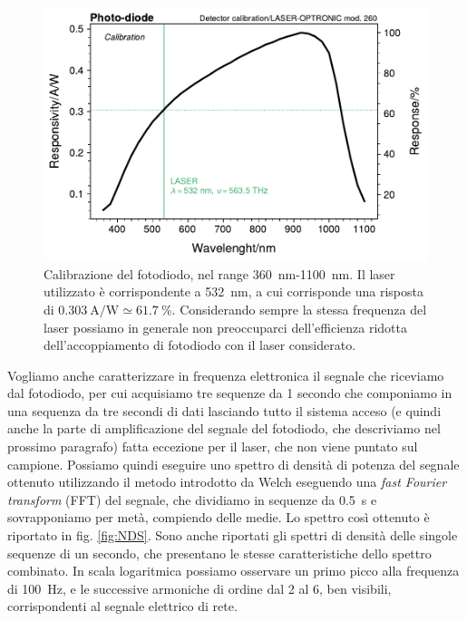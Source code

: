 \documentclass[
    prb,altaffilletter,citeautoscript,
    amsmath,amssymb,
    showpacs,showkeys,floatfix,
    reprint
]{revtex4-1}
\begin{document}
\begin{figure}
    \centering
    \includegraphics[width=\linewidth]{figures/detector_calib.pdf}
    \caption{Calibrazione del fotodiodo, nel range \SI{360}{\nano\metre}-\SI{1100}{\nano\metre}. Il laser utilizzato è corrispondente a \SI{532}{\nano\metre}, a cui corrisponde una risposta di $\SI{0.303}{\ampere\per\watt}\simeq\SI{61.7}{\%}$. Considerando sempre la stessa frequenza del laser possiamo in generale non preoccuparci dell'efficienza ridotta dell'accoppiamento di fotodiodo con il laser considerato.}
    \label{fig:detector_calib}
\end{figure}

Vogliamo anche caratterizzare in frequenza elettronica il segnale che riceviamo dal fotodiodo, per cui acquisiamo tre sequenze da 1 secondo che componiamo in una sequenza da tre secondi di dati lasciando tutto il sistema acceso (e quindi anche la parte di amplificazione del segnale del fotodiodo, che descriviamo nel prossimo paragrafo) fatta eccezione per il laser, che non viene puntato sul campione. Possiamo quindi eseguire uno spettro di densità di potenza del segnale ottenuto utilizzando il metodo introdotto da Welch\cite{welchUseFastFourier1967a} eseguendo una \emph{fast Fourier transform} (FFT)  del segnale, che dividiamo in sequenze da \SI{0.5}{\second} e sovrapponiamo per metà, compiendo delle medie. Lo spettro così ottenuto è riportato in fig. \ref{fig:NDS}. Sono anche riportati gli spettri di densità delle singole sequenze di un secondo, che presentano le stesse caratteristiche dello spettro combinato. In scala logaritmica possiamo osservare un primo picco alla frequenza di \SI{100}{\hertz}, e le successive armoniche di ordine dal 2 al 6, ben visibili, corrispondenti al segnale elettrico di rete. 
\end{document}

